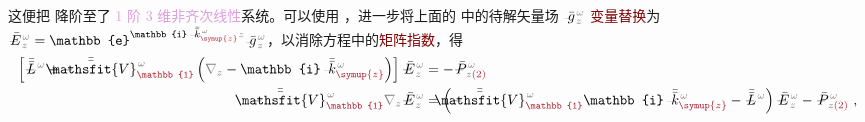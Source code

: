 这便把  降阶至了 \textcolor{Plum}{1 阶 3 维}\textcolor{Plum}{非齐次}\textcolor{Plum}{线性}系统。可以使用 ，进一步将上面的  中的待解矢量场 $\xint{{}^{}_{\mathcolor{gray}{-}}}{10}{\bar{g}}^{\;\!\mathcolor{gray}{\omega}}_{\;\! \mathcolor{gray}{z}}$ \textcolor{Maroon}{变量替换}为 $\xint{\mathcolor{gray}{-}}{25}{\bar{E}}^{\;\!\mathcolor{gray}{\omega}}_{\;\! \mathcolor{gray}{z}} = \mathbb{e}^{\mathbb{i} \xint{\begin{smallmatrix} ~ \\ {}^{}_{\mathcolor{gray}{-}} \\ ~ \end{smallmatrix}}{15}{\bar{\bar{k}}}_{\textcolor{Maroon}{\symup{z}}}^{\;\! \mathcolor{gray}{\omega}} \mathcolor{gray}{z}} \xint{{}^{}_{\mathcolor{gray}{-}}}{10}{\bar{g}}^{\;\!\mathcolor{gray}{\omega}}_{\;\! \mathcolor{gray}{z}}$，以消除方程中的\textcolor{Maroon}{矩阵指数}，得
\begin{subequations}
\begin{align}
	\left[ \xint{\mathcolor{gray}{-}}{32}{\bar{\bar{L}}}^{\;\! \mathcolor{gray}{\omega}} + \xint{\mathcolor{gray}{-}}{25}{\bar{\bar{\mathsfit{V}}}}^{\;\! \mathcolor{gray}{\omega}}_{\textcolor{Maroon}{\mathbb{1}}} \left( \mathcolor{gray}{\nabla_z} - \mathbb{i} \xint{\begin{smallmatrix} ~ \\ {}^{}_{\mathcolor{gray}{-}} \\ ~ \end{smallmatrix}}{15}{\bar{\bar{k}}}_{\textcolor{Maroon}{\symup{z}}}^{\;\! \mathcolor{gray}{\omega}} \right) \right] \xint{\mathcolor{gray}{-}}{295}{\bar{E}}^{\;\!\mathcolor{gray}{\omega}}_{\;\! \mathcolor{gray}{z}}
	&= - \xint{\mathcolor{gray}{-}}{30}{\bar{P}}^{\;\! \mathcolor{gray}{\omega}}_{\;\! \mathcolor{gray}{z} \textcolor{Maroon}{(2)}} \label{eq:nonlinear(2)-wave_wkrho-simplify6-SVA-E} \\
	\xint{\mathcolor{gray}{-}}{25}{\bar{\bar{\mathsfit{V}}}}^{\;\! \mathcolor{gray}{\omega}}_{\textcolor{Maroon}{\mathbb{1}}} \mathcolor{gray}{\nabla_z} \xint{\mathcolor{gray}{-}}{295}{\bar{E}}^{\;\!\mathcolor{gray}{\omega}}_{\;\! \mathcolor{gray}{z}}
	&= \left( \xint{\mathcolor{gray}{-}}{25}{\bar{\bar{\mathsfit{V}}}}^{\;\! \mathcolor{gray}{\omega}}_{\textcolor{Maroon}{\mathbb{1}}} \mathbb{i} \xint{\begin{smallmatrix} ~ \\ {}^{}_{\mathcolor{gray}{-}} \\ ~ \end{smallmatrix}}{15}{\bar{\bar{k}}}_{\textcolor{Maroon}{\symup{z}}}^{\;\! \mathcolor{gray}{\omega}} - \xint{\mathcolor{gray}{-}}{32}{\bar{\bar{L}}}^{\;\! \mathcolor{gray}{\omega}} \right) \xint{\mathcolor{gray}{-}}{295}{\bar{E}}^{\;\!\mathcolor{gray}{\omega}}_{\;\! \mathcolor{gray}{z}} - \xint{\mathcolor{gray}{-}}{30}{\bar{P}}^{\;\! \mathcolor{gray}{\omega}}_{\;\! \mathcolor{gray}{z} \textcolor{Maroon}{(2)}} ~,  \label{eq:nonlinear(2)-wave_wkrho-simplify6-SVA-E'}
\end{align}
\end{subequations}
